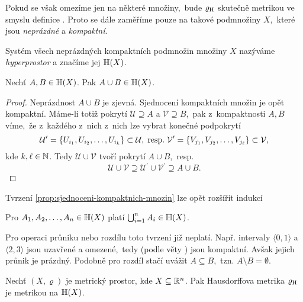 Pokud se však omezíme jen na některé množiny,~bude $\varrho_\textup{H}$ skutečně metrikou ve smyslu definice . Proto se dále zaměříme pouze na takové podmnožiny $X$,~které jsou \emph{neprázdné} a \emph{kompaktní}.
\begin{definition}[Hyperprostor]\label{def:hyperprostor}
    Systém všech neprázdných kompaktních podmnožin množiny $X$ nazýváme \emph{hyperprostor} a značíme jej $\mathbb{H}(X)$.
\end{definition}
\begin{proposition}\label{prop:sjednoceni-kompaktnich-mnozin}
    Nechť $A,B\in\mathbb{H}(X)$. Pak $A\cup B\in\mathbb{H}(X)$.
\end{proposition}
\begin{proof}
    Neprázdnost $A\cup B$ je zjevná. Sjednocení kompaktních množin je opět kompaktní. Máme-li totiž pokrytí $\mathcal{U}\supseteq A$ a $\mathcal{V}\supseteq B$,~pak z~kompaktnosti $A,B$ víme,~že z~každého z~nich z~nich lze vybrat konečné podpokrytí
    \[\mathcal{U}^\prime=\left\{U_{i_1},U_{i_2},\ldots,U_{i_k}\right\}\subset\mathcal{U},\;\text{resp.}\;\mathcal{V}^\prime=\left\{V_{j_1},V_{j_2},\ldots,V_{j_\ell}\right\}\subset\mathcal{V},\]
    kde $k,\ell\in\mathbb{N}$. Tedy $\mathcal{U}\cup\mathcal{V}$ tvoří pokrytí $A\cup B$,~resp.
    \[\mathcal{U}\cup\mathcal{V}\supseteq\mathcal{U}^\prime\cup\mathcal{V}^\prime\supseteq A\cup B.\]
\end{proof}
Tvrzení \ref{prop:sjednoceni-kompaktnich-mnozin} lze opět rozšířit indukcí
\begin{corollary}\label{cor:sjednoceni-n-kompaktnich-mnozin}
    Pro $A_1,A_2,\ldots,A_n\in\mathbb{H}(X)$ platí $\bigcup_{i=1}^n A_i\in\mathbb{H}(X)$.
\end{corollary}
Pro operaci průniku nebo rozdílu toto tvrzení již neplatí. Např. intervaly $\langle0,1\rangle$ a $\langle2,3\rangle$ jsou uzavřené a omezené,~tedy (podle věty ) jsou kompaktní. Avšak jejich průnik je prázdný. Podobně pro rozdíl stačí uvážit $A\subseteq B$,~tzn. $A\setminus B=\emptyset$.
\begin{theorem}\label{thm:hausdorffova-metrika-je-metrika}
    Nechť $(X,\varrho)$ je metrický prostor, kde $X\subseteq\mathbb{R}^n$. Pak Hausdorffova metrika $\varrho_\textup{H}$ je metrikou na $\mathbb{H}(X)$.
\end{theorem}
